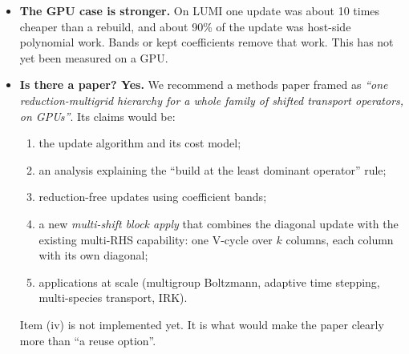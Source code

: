 \documentclass[11pt,a4paper]{article}
\begin{document}
\begin{itemize}
\begin{itemize}
  \item An update cost 7--20 times less than a rebuild setup (6.7--20.2).
  \item End-to-end it was 1.4--3.4 times faster on one CPU core.
  \item With stored or kept smoother coefficients, the update cost fell a further 4--9 times with identical iteration counts.
  \item The frozen hierarchy averaged 182 iterations and 9 of its 16 solves did not converge.
  \end{itemize}
\item \textbf{The GPU case is stronger.} On LUMI one update was about 10 times cheaper than a rebuild, and about 90\% of the update was host-side polynomial work. Bands or kept coefficients remove that work. This has not yet been measured on a GPU.
\item \textbf{Is there a paper? Yes.} We recommend a methods paper framed as \emph{``one reduction-multigrid hierarchy for a whole family of shifted transport operators, on GPUs''}. Its claims would be:
  \begin{enumerate}[label=(\roman*)]
  \item the update algorithm and its cost model;
  \item an analysis explaining the ``build at the least dominant operator'' rule;
  \item reduction-free updates using coefficient bands;
  \item a new \emph{multi-shift block apply} that combines the diagonal update with the existing multi-RHS capability: one V-cycle over $k$ columns, each column with its own diagonal;
  \item applications at scale (multigroup Boltzmann, adaptive time stepping, multi-species transport, IRK).
  \end{enumerate}
  Item (iv) is not implemented yet. It is what would make the paper clearly more than ``a reuse option''.
\end{itemize}
\end{document}
